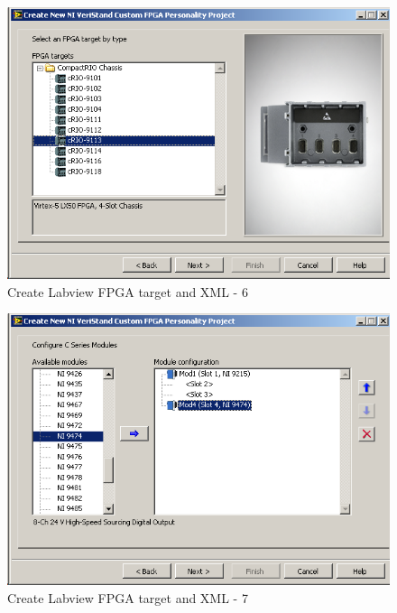 \documentclass[a4paper,english]{report}
\begin{document}
\begin{figure}[htb!]
	\centering \includegraphics[scale=0.45]{Screenshots/Screenshot_2015-01-16_19-24-43.png}
	\caption{Create Labview FPGA target and XML - 6}
	\label{fig: Create Labview FPGA target and XML-6} 
\end{figure}
\begin{figure}[htb!]
	\centering \includegraphics[scale=0.45]{Screenshots/Screenshot_2015-01-16_19-25-37.png}
	\caption{Create Labview FPGA target and XML - 7}
	\label{fig: Create Labview FPGA target and XML-7} 
\end{figure}
\end{document}
